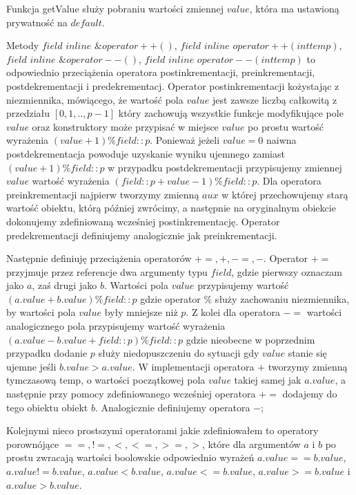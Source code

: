 \documentclass{article}
\begin{document}
Funkcja  getValue służy pobraniu wartości zmiennej $value$, która ma 
ustawioną prywatność na $default$.

Metody $field$ $inline$ $\&operator++()$, 
$field$ $inline$ $operator++(int temp)$,
$field$ $inline$ $\&operator--()$,
$field$ $inline$ $operator--(int temp)$ to odpowiednio przeciążenia
operatora postinkrementacji, preinkrementacji, postdekrementacji i predekrementacj.
Operator postinkrementacji kożystając z niezmiennika, mówiącego,
że wartość pola $value$ jest zawsze liczbą całkowitą z
przedziału $[0,1,..,p-1]$ który
zachowują wszystkie funkcje modyfikujące pole $value$ oraz konstruktory
może przypisać w miejsce $value$ po prostu wartość wyrażenia
$(value+1)\%field::p$. Ponieważ jeżeli $value=0$ naiwna postdekrementacja
powoduje uzyskanie wyniku ujemnego zamiast $(value+1)\%field::p$ w przypadku
postdekrementacji przypisujemy zmiennej $value$ wartość
wyrażenia $(field::p+value-1)\%field::p$. Dla operatora 
preinkrementacji najpierw tworzymy zmienną $aux$ w której przechowujemy
starą wartość obiektu, którą później zwrócimy, a następnie na oryginalnym 
obiekcie dokonujemy zdefiniowaną wcześniej postinkrementację.
Operator predekrementacji definiujemy analogicznie jak preinkrementacji.

Następnie definiuję przeciążenia operatorów $+=,+,-=,-$. Operator
$+=$ przyjmuje przez referencje dwa argumenty typu $field$,
gdzie pierwszy oznaczam jako $a$, zaś drugi jako $b$. Wartości pola
$value$ przypisujemy wartość $( a.value + b.value ) \%field::p$ gdzie 
operator $\%$ służy zachowaniu niezmiennika, by wartości pola $value$
były mniejsze niż $p$. Z kolei dla operatora $-=$ wartości analogicznego
pola przypisujemy wartość wyrażenia $(a.value-b.value+field::p)\%field::p$
gdzie nieobecne w poprzednim przypadku dodanie $p$ służy niedopuszczeniu
do sytuacji gdy $value$ stanie się ujemne jeśli $b.value > a.value$.
W implementacji operatora $+$ tworzymy zmienną tymczasową temp, o wartości
początkowej pola $value$ takiej samej jak $a.value$, a następnie
przy pomocy zdefiniowanego wcześniej operatora $+=$ dodajemy do tego obiektu
obiekt $b$. Analogicznie definiujemy operatora $-$;

Kolejnymi nieco prostszymi operatorami jakie zdefiniowałem to operatory porownójące
$==,!=,<,<=,>=,>$, które dla argumentów $a$ i $b$ po prostu zwracają wartości boolowskie odpowiednio 
wyrażeń $a.value == b.value$, $a.value != b.value$, $a.value < b.value$, 
$a.value <= b.value$, $a.value >= b.value$ i $a.value > b.value$.
\end{document}
